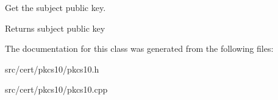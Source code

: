 Get the subject public key. \begin{DoxyReturn}{Returns}
subject public key 
\end{DoxyReturn}


The documentation for this class was generated from the following files\-:\begin{DoxyCompactItemize}
\item 
src/cert/pkcs10/pkcs10.\-h\item 
src/cert/pkcs10/pkcs10.\-cpp\end{DoxyCompactItemize}

